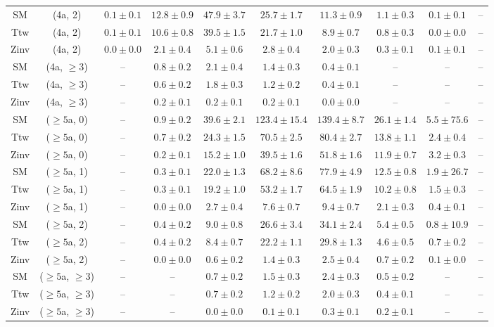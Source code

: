 \begin{table}[h!]
{\begin{tabular}{cccccccccc}
	SM & (4a, 2) & $0.1\pm 0.1$ & $12.8\pm 0.9$ & $47.9\pm 3.7$ & $25.7\pm 1.7$ & $11.3\pm 0.9$ & $1.1\pm 0.3$ & $0.1\pm 0.1$ & -- \\[0.5ex] 
	Ttw & (4a, 2) & $0.1\pm 0.1$ & $10.6\pm 0.8$ & $39.5\pm 1.5$ & $21.7\pm 1.0$ & $8.9\pm 0.7$ & $0.8\pm 0.3$ & $0.0\pm 0.0$ & -- \\[0.5ex] 
	Zinv & (4a, 2) & $0.0\pm 0.0$ & $2.1\pm 0.4$ & $5.1\pm 0.6$ & $2.8\pm 0.4$ & $2.0\pm 0.3$ & $0.3\pm 0.1$ & $0.1\pm 0.1$ & -- \\[0.5ex] 
	SM & (4a, $\ge3$) & -- & $0.8\pm 0.2$ & $2.1\pm 0.4$ & $1.4\pm 0.3$ & $0.4\pm 0.1$ & -- & -- & -- \\[0.5ex] 
	Ttw & (4a, $\ge3$) & -- & $0.6\pm 0.2$ & $1.8\pm 0.3$ & $1.2\pm 0.2$ & $0.4\pm 0.1$ & -- & -- & -- \\[0.5ex] 
	Zinv & (4a, $\ge3$) & -- & $0.2\pm 0.1$ & $0.2\pm 0.1$ & $0.2\pm 0.1$ & $0.0\pm 0.0$ & -- & -- & -- \\[0.5ex] 
	SM & ($\ge5$a, 0) & -- & $0.9\pm 0.2$ & $39.6\pm 2.1$ & $123.4\pm 15.4$ & $139.4\pm 8.7$ & $26.1\pm 1.4$ & $5.5\pm 75.6$ & -- \\[0.5ex] 
	Ttw & ($\ge5$a, 0) & -- & $0.7\pm 0.2$ & $24.3\pm 1.5$ & $70.5\pm 2.5$ & $80.4\pm 2.7$ & $13.8\pm 1.1$ & $2.4\pm 0.4$ & -- \\[0.5ex] 
	Zinv & ($\ge5$a, 0) & -- & $0.2\pm 0.1$ & $15.2\pm 1.0$ & $39.5\pm 1.6$ & $51.8\pm 1.6$ & $11.9\pm 0.7$ & $3.2\pm 0.3$ & -- \\[0.5ex] 
	SM & ($\ge5$a, 1) & -- & $0.3\pm 0.1$ & $22.0\pm 1.3$ & $68.2\pm 8.6$ & $77.9\pm 4.9$ & $12.5\pm 0.8$ & $1.9\pm 26.7$ & -- \\[0.5ex] 
	Ttw & ($\ge5$a, 1) & -- & $0.3\pm 0.1$ & $19.2\pm 1.0$ & $53.2\pm 1.7$ & $64.5\pm 1.9$ & $10.2\pm 0.8$ & $1.5\pm 0.3$ & -- \\[0.5ex] 
	Zinv & ($\ge5$a, 1) & -- & $0.0\pm 0.0$ & $2.7\pm 0.4$ & $7.6\pm 0.7$ & $9.4\pm 0.7$ & $2.1\pm 0.3$ & $0.4\pm 0.1$ & -- \\[0.5ex] 
	SM & ($\ge5$a, 2) & -- & $0.4\pm 0.2$ & $9.0\pm 0.8$ & $26.6\pm 3.4$ & $34.1\pm 2.4$ & $5.4\pm 0.5$ & $0.8\pm 10.9$ & -- \\[0.5ex] 
	Ttw & ($\ge5$a, 2) & -- & $0.4\pm 0.2$ & $8.4\pm 0.7$ & $22.2\pm 1.1$ & $29.8\pm 1.3$ & $4.6\pm 0.5$ & $0.7\pm 0.2$ & -- \\[0.5ex] 
	Zinv & ($\ge5$a, 2) & -- & $0.0\pm 0.0$ & $0.6\pm 0.2$ & $1.4\pm 0.3$ & $2.5\pm 0.4$ & $0.7\pm 0.2$ & $0.1\pm 0.0$ & -- \\[0.5ex] 
	SM & ($\ge5$a, $\ge3$) & -- & -- & $0.7\pm 0.2$ & $1.5\pm 0.3$ & $2.4\pm 0.3$ & $0.5\pm 0.2$ & -- & -- \\[0.5ex] 
	Ttw & ($\ge5$a, $\ge3$) & -- & -- & $0.7\pm 0.2$ & $1.2\pm 0.2$ & $2.0\pm 0.3$ & $0.4\pm 0.1$ & -- & -- \\[0.5ex] 
	Zinv & ($\ge5$a, $\ge3$) & -- & -- & $0.0\pm 0.0$ & $0.1\pm 0.1$ & $0.3\pm 0.1$ & $0.2\pm 0.1$ & -- & -- \\[0.5ex] 
	\hline
	\hline
\end{tabular}}
\end{table}
